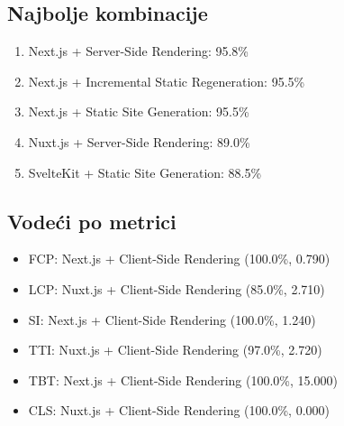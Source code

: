 \subsection{Najbolje kombinacije}
\begin{enumerate}
    \item Next.js + Server-Side Rendering: 95.8\%
    \item Next.js + Incremental Static Regeneration: 95.5\%
    \item Next.js + Static Site Generation: 95.5\%
    \item Nuxt.js + Server-Side Rendering: 89.0\%
    \item SvelteKit + Static Site Generation: 88.5\%
\end{enumerate}

\subsection{Vodeći po metrici}
\begin{itemize}
    \item FCP: Next.js + Client-Side Rendering (100.0\%, 0.790)
    \item LCP: Nuxt.js + Client-Side Rendering (85.0\%, 2.710)
    \item SI: Next.js + Client-Side Rendering (100.0\%, 1.240)
    \item TTI: Nuxt.js + Client-Side Rendering (97.0\%, 2.720)
    \item TBT: Next.js + Client-Side Rendering (100.0\%, 15.000)
    \item CLS: Nuxt.js + Client-Side Rendering (100.0\%, 0.000)
\end{itemize}

